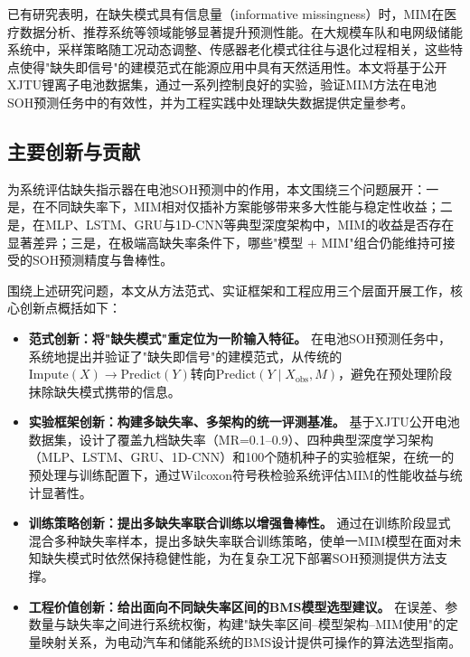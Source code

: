 \documentclass[10pt,a4paper]{ctexart}
\begin{document}
已有研究表明，在缺失模式具有信息量（informative missingness）时，MIM在医疗数据分析、推荐系统等领域能够显著提升预测性能\cite{sisk2023imputation,ehrig2025imputation}。在大规模车队和电网级储能系统中，采样策略随工况动态调整、传感器老化模式往往与退化过程相关，这些特点使得"缺失即信号"的建模范式在能源应用中具有天然适用性。本文将基于公开XJTU锂离子电池数据集，通过一系列控制良好的实验，验证MIM方法在电池SOH预测任务中的有效性，并为工程实践中处理缺失数据提供定量参考。

\subsection{主要创新与贡献}

为系统评估缺失指示器在电池SOH预测中的作用，本文围绕三个问题展开：一是，在不同缺失率下，MIM相对仅插补方案能够带来多大性能与稳定性收益；二是，在MLP、LSTM、GRU与1D-CNN等典型深度架构中，MIM的收益是否存在显著差异；三是，在极端高缺失率条件下，哪些"模型 + MIM"组合仍能维持可接受的SOH预测精度与鲁棒性。

围绕上述研究问题，本文从方法范式、实证框架和工程应用三个层面开展工作，核心创新点概括如下：

\begin{itemize}
  \item \textbf{范式创新：将"缺失模式"重定位为一阶输入特征。} 在电池SOH预测任务中，系统地提出并验证了"缺失即信号"的建模范式，从传统的$\text{Impute}(X)\rightarrow\text{Predict}(Y)$转向$\text{Predict}(Y \mid X_{\mathrm{obs}}, M)$，避免在预处理阶段抹除缺失模式携带的信息。

  \item \textbf{实验框架创新：构建多缺失率、多架构的统一评测基准。} 基于XJTU公开电池数据集，设计了覆盖九档缺失率（MR=0.1--0.9）、四种典型深度学习架构（MLP、LSTM、GRU、1D-CNN）和100个随机种子的实验框架，在统一的预处理与训练配置下，通过Wilcoxon符号秩检验系统评估MIM的性能收益与统计显著性。

  \item \textbf{训练策略创新：提出多缺失率联合训练以增强鲁棒性。} 通过在训练阶段显式混合多种缺失率样本，提出多缺失率联合训练策略，使单一MIM模型在面对未知缺失模式时依然保持稳健性能，为在复杂工况下部署SOH预测提供方法支撑。

  \item \textbf{工程价值创新：给出面向不同缺失率区间的BMS模型选型建议。} 在误差、参数量与缺失率之间进行系统权衡，构建"缺失率区间--模型架构--MIM使用"的定量映射关系，为电动汽车和储能系统的BMS设计提供可操作的算法选型指南。
\end{itemize}
\end{document}

